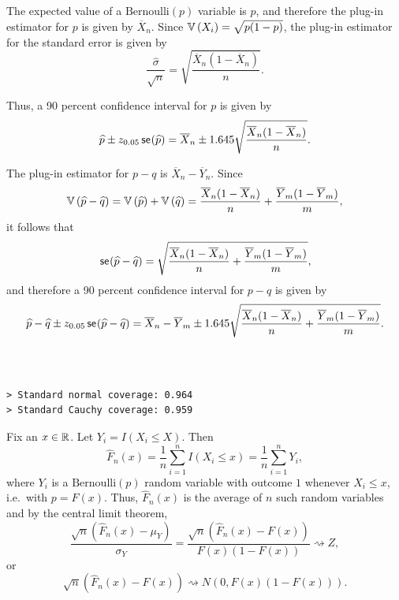 \begin{ex}
  The expected value of a $\text{Bernoulli}(p)$ variable is $p$, and therefore
  the plug-in estimator for $p$ is given by $\overline{X}_n$. Since $\mathbb{V}\left(X_i\right)
    =\sqrt{p(1-p)}$, the plug-in estimator for the standard error is given
  by
  \[
    \frac{\widehat{\sigma}}{\sqrt{n}}
    =\sqrt{\frac{\overline{X}_n(1-\overline{X}_n)}{n}}.
  \]

  Thus, a 90 percent confidence interval for $p$ is given by
  \[
    \widehat{p}\pm z_{0.05}\,\textsf{se}\mkern-2mu\left(\widehat{p} \right)
    =\overline{X}_n\pm 1.645\sqrt{\frac{\overline{X}_n(1-\overline{X}_n)}{n}}.
  \]

  The plug-in estimator for $p-q$ is $\overline{X}_n-\overline{Y}_n$. Since
  \[
    \mathbb{V}\left(\widehat{p}-\widehat{q}\right)
    =\mathbb{V}\left(\widehat{p}\right)+\mathbb{V}\left(\widehat{q}\right)
    =\frac{\overline{X}_n(1-\overline{X}_n)}{n}
    +\frac{\overline{Y}_m(1-\overline{Y}_m)}{m},
  \]
  it follows that
  \[
    \,\textsf{se}\mkern-2mu\left(\widehat{p}-\widehat{q} \right)
    =\sqrt{\frac{\overline{X}_n(1-\overline{X}_n)}{n}
      +\frac{\overline{Y}_m(1-\overline{Y}_m)}{m}},
  \]
  and therefore a 90 percent confidence interval for $p-q$ is given by
  \[
    \widehat{p}-\widehat{q}
    \pm z_{0.05}\,\textsf{se}\mkern-2mu\left(\widehat{p}-\widehat{q} \right)
    =\overline{X}_n-\overline{Y}_m\pm
    1.645\sqrt{\frac{\overline{X}_n(1-\overline{X}_n)}{n}
      +\frac{\overline{Y}_m(1-\overline{Y}_m)}{m}}.
  \]
\end{ex}

\begin{ex}~
  \inputminted{python}{src/07-03.py}
  \begin{verbatim}
> Standard normal coverage: 0.964
> Standard Cauchy coverage: 0.959
  \end{verbatim}
\end{ex}

\begin{ex}
  Fix an $x\in\mathbb{R}$. Let $Y_i=I(X_i\leq X)$. Then
  \[
    \widehat{F}_n(x)
    =\frac{1}{n}\sum_{i=1}^nI(X_i\leq x)
    =\frac{1}{n}\sum_{i=1}^nY_i,
  \]
  where $Y_i$ is a $\text{Bernoulli}(p)$ random variable with outcome $1$
  whenever $X_i \leq x$, i.e.\ with $p=F(x)$. Thus, $\widehat{F}_n(x)$
  is the average of $n$ such random variables and by the central limit theorem,
  \[
    \frac{\sqrt{n}(\widehat{F}_n(x)-\mu_Y)}{\sigma_Y}
    =\frac{\sqrt{n}(\widehat{F}_n(x)-F(x))}{F(x)(1-F(x))}
    \rightsquigarrow Z,
  \]
  or
  \[
    \sqrt{n}\left(\widehat{F}_n(x)-F(x)\right)
    \rightsquigarrow N\left(0, F(x)(1-F(x))\right).
  \]
\end{ex}

